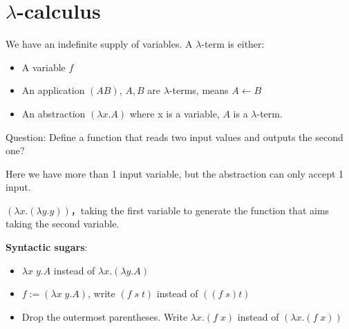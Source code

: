\section{\texorpdfstring{\(\lambda\)}{λ}-calculus}



\begin{definition}
We have an indefinite supply of variables. A \(\lambda\)-term is either:

\begin{itemize}
\item
  A variable \(f\)
\item
  An application \((A B)\), \(A,B\) are \(\lambda\)-terms, means
  \(A \leftarrow B\)
\item
  An abstraction \((\lambda x.A)\) where x is a variable, \(A\) is a
  \(\lambda\)-term.
\end{itemize}
\end{definition}


Question: Define a function that reads two input values and outputs the second one?

Here we have more than 1 input variable, but the abstraction can only
accept 1 input.

\((\lambda x.(\lambda y.y))\)，taking the first variable to generate the
function that aims taking the second variable.

\textbf{Syntactic sugars}:

\begin{itemize}
\item
  \(\lambda x\;y.A\) instead of \(\lambda x.(\lambda y.A)\)
\item
  \(f:=(\lambda x\;y.A)\), write \((f\; s\; t)\) instead of
  \(((f\;s)t)\)
\item
  Drop the outermost parentheses. Write \(\lambda x.(f\;x)\) instead of
  \((\lambda x. (f\; x))\)
\end{itemize}
